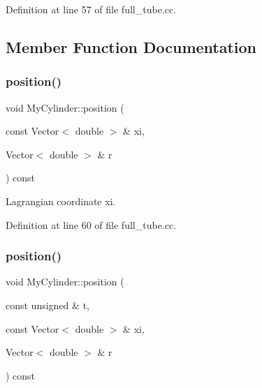 Definition at line 57 of file full\+\_\+tube.\+cc.



\subsection{Member Function Documentation}
\mbox{\label{classMyCylinder_add84f8717aa286d627ae9175e0c27d4a}} 
\subsubsection{\texorpdfstring{position()}{position()}\hspace{0.1cm}{\footnotesize\ttfamily [1/2]}}
{\footnotesize\ttfamily void My\+Cylinder\+::position (\begin{DoxyParamCaption}\item[{const Vector$<$ double $>$ \&}]{xi,  }\item[{Vector$<$ double $>$ \&}]{r }\end{DoxyParamCaption}) const\hspace{0.3cm}{\ttfamily [inline]}}



Lagrangian coordinate xi. 



Definition at line 60 of file full\+\_\+tube.\+cc.

\mbox{\label{classMyCylinder_a6ba18b398d0626bd14d7cc8c5873b8a2}} 
\subsubsection{\texorpdfstring{position()}{position()}\hspace{0.1cm}{\footnotesize\ttfamily [2/2]}}
{\footnotesize\ttfamily void My\+Cylinder\+::position (\begin{DoxyParamCaption}\item[{const unsigned \&}]{t,  }\item[{const Vector$<$ double $>$ \&}]{xi,  }\item[{Vector$<$ double $>$ \&}]{r }\end{DoxyParamCaption}) const\hspace{0.3cm}{\ttfamily [inline]}}

